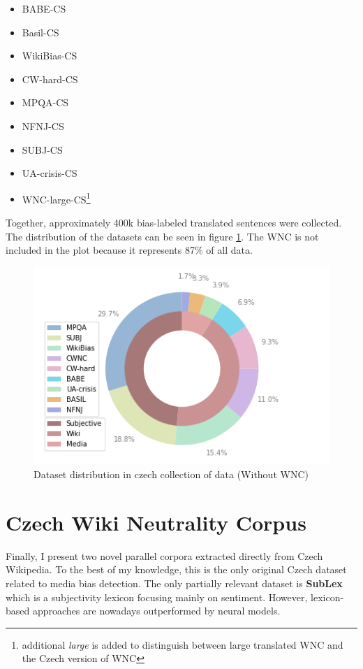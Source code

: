 \begin{itemize}
    \item BABE-CS
    \item Basil-CS
    \item WikiBias-CS
    \item CW-hard-CS
    \item MPQA-CS
    \item NFNJ-CS
    \item SUBJ-CS
    \item UA-crisis-CS
    \item WNC-large-CS\footnote{additional \textit{large} is added to distinguish between large translated WNC and the Czech version of WNC}
\end{itemize}

Together, approximately 400k bias-labeled translated sentences were collected. The distribution of the datasets can be seen in figure \ref{fig:cz_data}. The WNC is not included in the plot because it represents 87\% of all data. 


\begin{figure}
  \includegraphics[scale=0.5]{my_modules/multimedia/withoutWNC.png}
  \caption{Dataset distribution in czech collection of data (Without WNC)}
  \label{fig:cz_data}
\end{figure}




\section{Czech Wiki Neutrality Corpus}
Finally, I present two novel parallel corpora extracted directly from Czech Wikipedia. To the best of my knowledge, this is the only original Czech dataset related to media bias detection. The only partially relevant dataset is \textbf{SubLex}\cite{11858/00-097C-0000-0022-FF60-B} which is a subjectivity lexicon focusing mainly on sentiment. However, lexicon-based approaches are nowadays outperformed by neural models.

